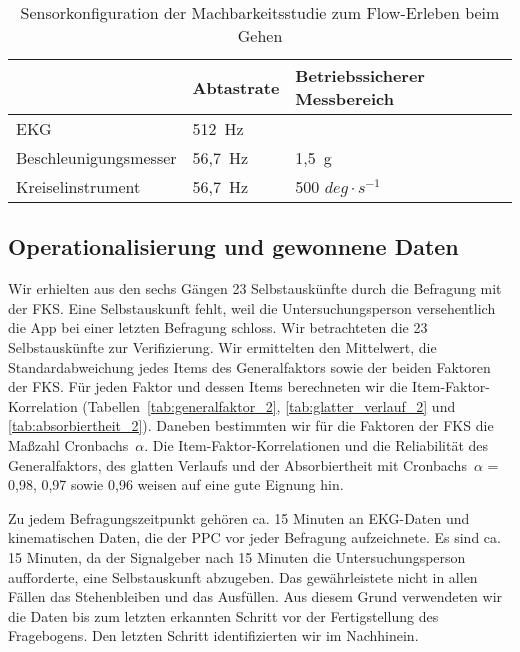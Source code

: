 \begin{table}
	[!htb] \caption[Sensorkonfiguration (Machbarkeitsstudie: Gehen)]{Sensorkonfiguration der Machbarkeitsstudie zum Flow-Erleben beim Gehen} \label{tab:sensorkonfiguration_2} 
	\begin{tabularx}
		{ 
		\textwidth}{p{} p{} p{}} \toprule & Abtastrate & Betriebssicherer Messbereich \\
		\midrule \ac{EKG} & 512~Hz & \\
		Beschleunigungsmesser & 56,7~Hz & 1,5~g \\
		Kreiselinstrument & 56,7~Hz & 500 $deg \cdot s^{-1}$ \\
		\bottomrule 
	\end{tabularx}
\end{table}

\subsection{Operationalisierung und gewonnene Daten} 

\label{sub:operationalisierung_und_gewonnene_daten_5_2}

Wir erhielten aus den sechs Gängen 23 Selbstauskünfte durch die Befragung mit der \ac{FKS}. Eine Selbstauskunft fehlt, weil die Untersuchungsperson versehentlich die App bei einer letzten Befragung schloss. Wir betrachteten die 23 Selbstauskünfte zur Verifizierung. Wir ermittelten den Mittelwert, die Standardabweichung jedes Items des Generalfaktors sowie der beiden Faktoren der \ac{FKS}. Für jeden Faktor und dessen Items berechneten wir die Item-Faktor-Korrelation (Tabellen~\ref{tab:generalfaktor_2}, \ref{tab:glatter_verlauf_2} und \ref{tab:absorbiertheit_2}). Daneben bestimmten wir für die Faktoren der \ac{FKS} die Maßzahl Cronbachs~$\alpha$. Die Item-Faktor-Korrelationen und die Reliabilität des Generalfaktors, des glatten Verlaufs und der Absorbiertheit mit Cronbachs~$\alpha$ = 0,98, 0,97 sowie 0,96 weisen auf eine gute Eignung hin. 

Zu jedem Befragungszeitpunkt gehören ca. 15 Minuten an \ac{EKG}-Daten und kinematischen Daten, die der \ac{PPC} vor jeder Befragung aufzeichnete. Es sind ca. 15 Minuten, da der Signalgeber nach 15 Minuten die Untersuchungsperson aufforderte, eine Selbstauskunft abzugeben. Das gewährleistete nicht in allen Fällen das Stehenbleiben und das Ausfüllen. Aus diesem Grund verwendeten wir die Daten bis zum letzten erkannten Schritt vor der Fertigstellung des Fragebogens. Den letzten Schritt identifizierten wir im Nachhinein. 

